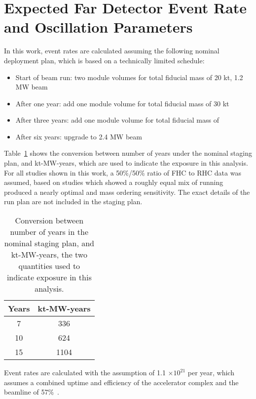 \section{Expected Far Detector Event Rate and Oscillation Parameters}
\label{sec:rate}

In this work,  event rates are calculated assuming the following nominal deployment plan, which is based on a technically limited schedule:
\begin{itemize}
    \item Start of beam run: two  module
    volumes for total fiducial mass of 20 kt, 1.2 MW beam
    \item After one year: add one  module  volume for total fiducial mass of 30 kt
    \item After three years: add one  module  volume for total fiducial mass of \fdfiducialmass
    \item After six years: upgrade to 2.4 MW beam
\end{itemize}
Table~\ref{tab:exposures} shows the conversion between number of years under the nominal staging plan, and  kt-MW-years, which are used to indicate the exposure in this analysis. For all studies shown in this work, a 50\%/50\% ratio of FHC to RHC data was assumed, based on studies which showed a roughly equal mix of running produced a nearly optimal \deltacp and mass ordering sensitivity. The exact details of the run plan are not included in the staging plan.

\begin{table}[htbp]
  \centering
  \begin{tabular}{cc}
    \hline
    Years & kt-MW-years \\
    \hline\hline
    7 & 336 \\
    10 & 624 \\
    15 & 1104 \\
    \hline
  \end{tabular}
  \caption{Conversion between number of years in the nominal staging plan, and kt-MW-years, the two quantities used to indicate exposure in this analysis.}
  \label{tab:exposures}
\end{table}

Event rates are calculated with the assumption of 1.1 $\times 10^{21}$  per year, which assumes a combined uptime and efficiency of the  accelerator complex and the  beamline of 57\%~\cite{Abi:2020evt}.

